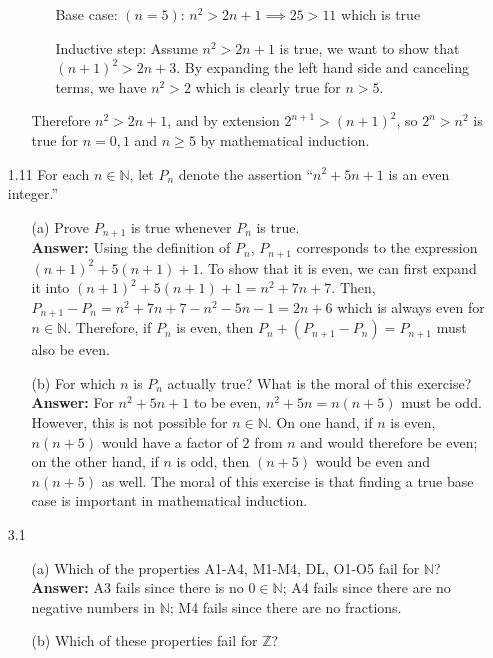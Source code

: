 \documentclass{article}
\begin{document}
\begin{itemize}
\begin{itemize}
\begin{itemize}
                        \item [] Base case: $(n=5)$: $n^2>2n+1\implies 25>11$ which is true
                        \item [] Inductive step: Assume $n^2>2n+1$ is true, we want to show that $(n+1)^2>2n+3$. By expanding the left hand side and canceling terms, we have $n^2>2$ which is clearly true for $n>5$.
                    \end{itemize}
                    Therefore $n^2>2n+1$, and by extension $2^{n+1}>(n+1)^2$, so $2^n>n^2$ is true for $n=0,1$ and $n\geq 5$ by mathematical induction.
          \end{itemize}
    \item [1.11] For each $n\in\mathbb{N}$, let $P_n$ denote the assertion ``$n^2+5n+1$ is an even integer.''
          \begin{itemize}
              \item [(a)] Prove $P_{n+1}$ is true whenever $P_n$ is true.\\
                    \textbf{Answer: } Using the definition of $P_n$, $P_{n+1}$ corresponds to the expression $(n+1)^2+5(n+1)+1$. To show that it is even, we can first expand it into $(n+1)^2+5(n+1)+1=n^2+7n+7$. Then, $P_{n+1}-P_n=n^2+7n+7-n^2-5n-1=2n+6$ which is always even for $n\in\mathbb{N}$. Therefore, if $P_n$ is even, then $P_n+(P_{n+1}-P_n)=P_{n+1}$ must also be even.
              \item [(b)] For which $n$ is $P_n$ actually true? What is the moral of this exercise?\\
                    \textbf{Answer: } For $n^2+5n+1$ to be even, $n^2+5n=n(n+5)$ must be odd. However, this is not possible for $n\in\mathbb{N}$. On one hand, if $n$ is even, $n(n+5)$ would have a factor of $2$ from $n$ and would therefore be even; on the other hand, if $n$ is odd, then $(n+5)$ would be even and $n(n+5)$ as well. The moral of this exercise is that finding a true base case is important in mathematical induction.
          \end{itemize}
    \item [3.1]
          \begin{itemize}
              \item [(a)] Which of the properties A1-A4, M1-M4, DL, O1-O5 fail for $\mathbb{N}$?\\
                    \textbf{Answer: } A3 fails since there is no $0\in\mathbb{N}$; A4 fails since there are no negative numbers in $\mathbb{N}$; M4 fails since there are no fractions.
              \item [(b)] Which of these properties fail for $\mathbb{Z}$?\\

\end{itemize}
\end{itemize}
\end{document}
